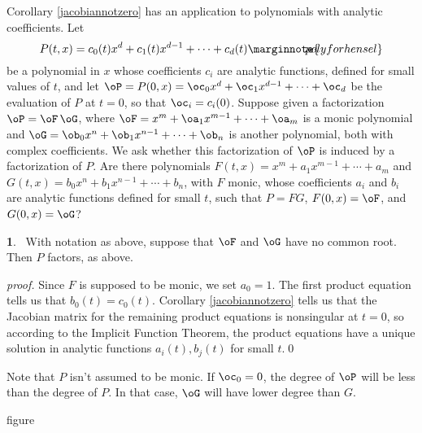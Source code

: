\documentclass[leqno]{book}
\newcommand\Marginnote[1]{\marginnote{\hspace{-12pt}\normalfont{#1}}}
\theoremstyle{definition}%
\numberwithin{equation}{section}
\theoremstyle{theorem} %
\newtheorem{lemma}[equation]{}
\renewenvironment{proof}{\no \emph{proof.}}{}
\begin{document}
\bs  Corollary \ref{jacobiannotzero} has an application to polynomials with
analytic coefficients.
 Let
\begin{equation}
 P(t,x) = c_0(t)x^d+ c_1(t)x^{d-1} + \cdots + c_d(t) 
\Marginnote{polyforhensel}
	\label{polyforhensel}
\end{equation}
be a polynomial in $x$ whose coefficients $c_i$ are analytic
functions, defined for small values of $t$, and let $\oP = P(0,x) =
\oc_0x^d + \oc_1x^{d-1} + \cdots + \oc_d$ be the evaluation of $P$ at
$t=0$, so that $\oc_i = c_i(0)$.  Suppose given a factorization $\oP =
\oF \,\oG$, where $\oF = x^m+ \oa_1x^{m-1} +\cdots + \oa_m$ is a monic
polynomial and $\oG = \ob_0x^n + \ob_1x^{n-1} + \cdots + \ob_n$ is
another polynomial, both with complex coefficients.  We ask whether
this factorization of $\oP$ is induced by a factorization of $P$.  Are
there polynomials $F(t,x) = x^m+ a_1x^{m-1} +\cdots + a_m$ and $G(t,x)
= b_0x^n + b_1x^{n-1} + \cdots + b_n$, with $F$ monic, whose
coefficients $a_i$ and $b_i$ are analytic functions defined for small
$t$, such that $P = FG$, $F(0,x) = \oF$, and $G(0,x)= \oG$?


 \begin{lemma}\Marginnote{hensellemma}\;\,
With notation as above, suppose that 
 $\oF$ and $\oG$ have no common root.
Then $P$ factors, as above.
\label{hensellemma} \end{lemma}

 \begin{proof} Since $F$ is supposed to be monic, we set $a_0=1$. The first
product equation tells us that $b_0(t)=c_0(t)$.  Corollary
\ref{jacobiannotzero} tells us that the Jacobian matrix for the
remaining product equations is nonsingular at $t=0$, so according to
the Implicit Function Theorem, the product equations have a unique
solution  in analytic functions
$a_i(t),b_j(t)$ for small $t$.\qed\end{proof}

\msno
Note that $P$ isn't assumed to be monic.  If $\oc_0=0$, the degree of
$\oP$ will be less than the degree of $P$.  In that case, $\oG$ will
have lower degree than $G$.

\ms
 \centerline{figure}
\end{document}
